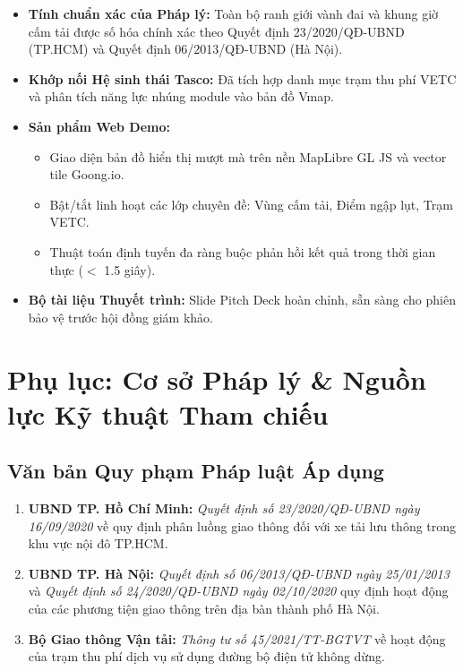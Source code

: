 \documentclass[11pt,a4paper]{article}
\begin{document}
\begin{itemize}
  \item[$\boxtimes$] \textbf{Tính chuẩn xác của Pháp lý:} Toàn bộ ranh giới vành đai và khung giờ cấm tải được số hóa chính xác theo Quyết định 23/2020/QĐ-UBND (TP.HCM) và Quyết định 06/2013/QĐ-UBND (Hà Nội).
  \item[$\boxtimes$] \textbf{Khớp nối Hệ sinh thái Tasco:} Đã tích hợp danh mục trạm thu phí VETC và phân tích năng lực nhúng module vào bản đồ Vmap.
  \item[$\boxtimes$] \textbf{Sản phẩm Web Demo:}
  \begin{itemize}
    \item Giao diện bản đồ hiển thị mượt mà trên nền MapLibre GL JS và vector tile Goong.io.
    \item Bật/tắt linh hoạt các lớp chuyên đề: Vùng cấm tải, Điểm ngập lụt, Trạm VETC.
    \item Thuật toán định tuyến đa ràng buộc phản hồi kết quả trong thời gian thực ($<$ 1.5 giây).
  \end{itemize}
  \item[$\boxtimes$] \textbf{Bộ tài liệu Thuyết trình:} Slide Pitch Deck hoàn chỉnh, sẵn sàng cho phiên bảo vệ trước hội đồng giám khảo.
\end{itemize}

\section{Phụ lục: Cơ sở Pháp lý \& Nguồn lực Kỹ thuật Tham chiếu}

\subsection{Văn bản Quy phạm Pháp luật Áp dụng}
\begin{enumerate}
  \item \textbf{UBND TP. Hồ Chí Minh:} \textit{Quyết định số 23/2020/QĐ-UBND ngày 16/09/2020} về quy định phân luồng giao thông đối với xe tải lưu thông trong khu vực nội đô TP.HCM.
  \item \textbf{UBND TP. Hà Nội:} \textit{Quyết định số 06/2013/QĐ-UBND ngày 25/01/2013} và \textit{Quyết định số 24/2020/QĐ-UBND ngày 02/10/2020} quy định hoạt động của các phương tiện giao thông trên địa bàn thành phố Hà Nội.
  \item \textbf{Bộ Giao thông Vận tải:} \textit{Thông tư số 45/2021/TT-BGTVT} về hoạt động của trạm thu phí dịch vụ sử dụng đường bộ điện tử không dừng.
\end{enumerate}
\end{document}

